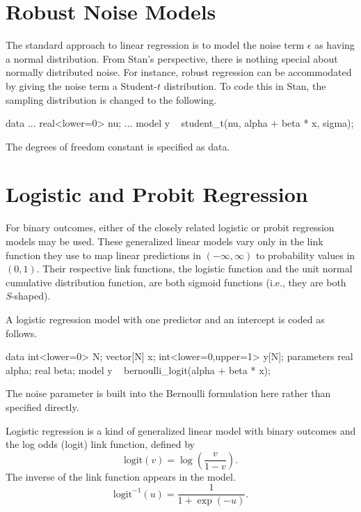 \section{Robust Noise Models}

The standard approach to linear regression is to model the noise
term $\epsilon$ as having a normal distribution.  From Stan's
perspective, there is nothing special about normally distributed
noise.  For instance, robust regression can be accommodated by giving
the noise term a Student-$t$ distribution.  To code this in Stan, the
sampling distribution is changed to the following.
%

\begin{stancode}
data {
  ...
  real<lower=0> nu;
}
...
model {
  y ~ student_t(nu, alpha + beta * x, sigma);
}
\end{stancode}
%
The degrees of freedom constant  is specified as data.

\section{Logistic and Probit Regression}\label{logistic-probit-regression.section}

For binary outcomes, either of the closely related logistic or probit
regression models may be used.  These generalized linear models vary
only in the link function they use to map linear predictions in
$(-\infty,\infty)$ to probability values in $(0,1)$.  Their respective
link functions, the logistic function and the unit normal cumulative distribution
function, are both sigmoid functions (i.e., they are both {\it S}-shaped).

A logistic regression model with one predictor and an intercept is coded as
follows.
%

\begin{stancode}
data {
  int<lower=0> N;
  vector[N] x;
  int<lower=0,upper=1> y[N];
}
parameters {
  real alpha;
  real beta;
}
model {
  y ~ bernoulli_logit(alpha + beta * x);
}
\end{stancode}
%
The noise parameter is built into the Bernoulli formulation here
rather than specified directly.

Logistic regression is a kind of generalized linear model with binary
outcomes and the log odds (logit) link function, defined by
%
\[
\mbox{logit}(v) = \log \left( \frac{v}{1-v} \right).
\]
%
The inverse of the link function appears in the model.
%
\[
\mbox{logit}^{-1}(u) = \frac{1}{1 + \exp(-u)}.
\]
%


